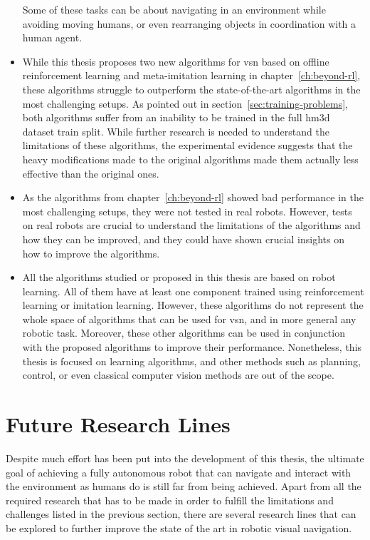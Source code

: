\begin{itemize}
    Some of these tasks can be about navigating in an environment while avoiding moving humans, or even rearranging objects in coordination with a human agent.
    \item While this thesis proposes two new algorithms for \acrshort{vsn} based on offline reinforcement learning and meta-imitation learning in chapter~\ref{ch:beyond-rl}, these algorithms struggle to outperform the state-of-the-art algorithms in the most challenging setups.
    As pointed out in section~\ref{sec:training-problems}, both algorithms suffer from an inability to be trained in the full \acrshort{hm3d} dataset train split.
    While further research is needed to understand the limitations of these algorithms, the experimental evidence suggests that the heavy modifications made to the original algorithms made them actually less effective than the original ones.
    \item As the algorithms from chapter~\ref{ch:beyond-rl} showed bad performance in the most challenging setups, they were not tested in real robots.
    However, tests on real robots are crucial to understand the limitations of the algorithms and how they can be improved, and they could have shown crucial insights on how to improve the algorithms.
    \item All the algorithms studied or proposed in this thesis are based on robot learning.
    All of them have at least one component trained using reinforcement learning or imitation learning.
    However, these algorithms do not represent the whole space of algorithms that can be used for \acrshort{vsn}, and in more general any robotic task.
    Moreover, these other algorithms can be used in conjunction with the proposed algorithms to improve their performance.
    Nonetheless, this thesis is focused on learning algorithms, and other methods such as planning, control, or even classical computer vision methods are out of the scope.
\end{itemize}

\section{Future Research Lines}\label{sec:future-work}

Despite much effort has been put into the development of this thesis, the ultimate goal of achieving a fully autonomous robot that can navigate and interact with the environment as humans do is still far from being achieved.
Apart from all the required research that has to be made in order to fulfill the limitations and challenges listed in the previous section, there are several research lines that can be explored to further improve the state of the art in robotic visual navigation.

